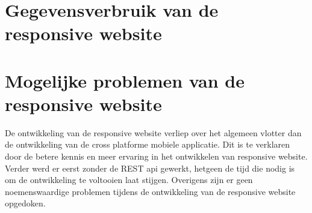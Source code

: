 \section{Gegevensverbruik van de responsive website}

\section{Mogelijke problemen van de responsive website}
De ontwikkeling van de responsive website verliep over het algemeen vlotter dan de ontwikkeling van de cross platforme mobiele applicatie.
Dit is te verklaren door de betere kennis en meer ervaring in het ontwikkelen van responsive website.
Verder werd er eerst zonder de REST api gewerkt, hetgeen de tijd die nodig is om de ontwikkeling te voltooien laat stijgen.
Overigens zijn er geen noemenswaardige problemen tijdens de ontwikkeling van de responsive website opgedoken.

